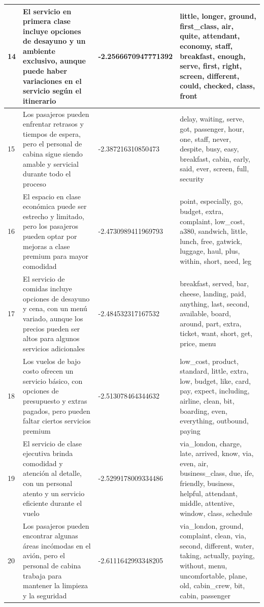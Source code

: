 \documentclass{report}
\begin{document}
\begin{longtable}{|p{1cm}|p{4cm}|p{4cm}|p{6cm}|}
                    \hline
                    14 & El servicio en primera clase incluye opciones de desayuno y un ambiente exclusivo, aunque puede haber variaciones en el servicio según el itinerario & -2.2566670947771392 & little, longer, ground, first\_class, air, quite, attendant, economy, staff, breakfast, enough, serve, first, right, screen, different, could, checked, class, front \\
                    \hline
                    15 & Los pasajeros pueden enfrentar retrasos y tiempos de espera, pero el personal de cabina sigue siendo amable y servicial durante todo el proceso & -2.387216310850473 & delay, waiting, serve, got, passenger, hour, one, staff, never, despite, busy, easy, breakfast, cabin, early, said, ever, screen, full, security \\
                    \hline
                    16 & El espacio en clase económica puede ser estrecho y limitado, pero los pasajeros pueden optar por mejoras a clase premium para mayor comodidad & -2.4730989411969793 & point, especially, go, budget, extra, complaint, low\_cost, a380, sandwich, little, lunch, free, gatwick, luggage, haul, plus, within, short, need, leg \\
                    \hline
                    17 & El servicio de comidas incluye opciones de desayuno y cena, con un menú variado, aunque los precios pueden ser altos para algunos servicios adicionales & -2.484532317167532 & breakfast, served, bar, cheese, landing, paid, anything, last, second, available, board, around, part, extra, ticket, want, short, get, price, menu \\
                    \hline
                    18 & Los vuelos de bajo costo ofrecen un servicio básico, con opciones de presupuesto y extras pagados, pero pueden faltar ciertos servicios premium & -2.513078464344632 & low\_cost, product, standard, little, extra, low, budget, like, card, pay, expect, including, airline, clean, bit, boarding, even, everything, outbound, paying \\
                    \hline
                    19 & El servicio de clase ejecutiva brinda comodidad y atención al detalle, con un personal atento y un servicio eficiente durante el vuelo & -2.5299178009334486 & via\_london, charge, late, arrived, know, via, even, air, business\_class, due, ife, friendly, business, helpful, attendant, middle, attentive, window, class, schedule \\
                    \hline
                    20 & Los pasajeros pueden encontrar algunas áreas incómodas en el avión, pero el personal de cabina trabaja para mantener la limpieza y la seguridad & -2.6111642993348205 & via\_london, ground, complaint, clean, via, second, different, water, taking, actually, paying, without, menu, uncomfortable, plane, old, cabin\_crew, bit, cabin, passenger \\

\end{longtable}
\end{document}
